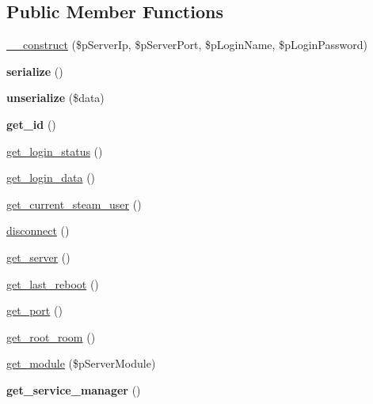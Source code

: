 \subsection*{Public Member Functions}
\begin{DoxyCompactItemize}
\item 
\hyperlink{classsteam__connector_a3076f259747852f77015c19d620247f2}{\_\-\_\-construct} (\$pServerIp, \$pServerPort, \$pLoginName, \$pLoginPassword)
\item 
\hypertarget{classsteam__connector_adbb7c9f66554f801fb9f9d9cffbcee2a}{
{\bfseries serialize} ()}
\label{classsteam__connector_adbb7c9f66554f801fb9f9d9cffbcee2a}

\item 
\hypertarget{classsteam__connector_a41443e8c5fc32e22a9622c1c799d1b94}{
{\bfseries unserialize} (\$data)}
\label{classsteam__connector_a41443e8c5fc32e22a9622c1c799d1b94}

\item 
\hypertarget{classsteam__connector_ade04f8f1607b1c9e231cfb18bcb102da}{
{\bfseries get\_\-id} ()}
\label{classsteam__connector_ade04f8f1607b1c9e231cfb18bcb102da}

\item 
\hyperlink{classsteam__connector_a19e7b6815de0c9b782027c7f951d1b1e}{get\_\-login\_\-status} ()
\item 
\hyperlink{classsteam__connector_aa168c3c05b37379418f79d4a9b5ce3b3}{get\_\-login\_\-data} ()
\item 
\hyperlink{classsteam__connector_a6dc38fa65af32f2038216f684e29dac6}{get\_\-current\_\-steam\_\-user} ()
\item 
\hyperlink{classsteam__connector_a606160ead141a3f6f137f3f7cd10b765}{disconnect} ()
\item 
\hyperlink{classsteam__connector_ae7ccee5b6dfd9129ffb37f334144d3ba}{get\_\-server} ()
\item 
\hyperlink{classsteam__connector_a428ddd853855d3eaf71e913a436c844a}{get\_\-last\_\-reboot} ()
\item 
\hyperlink{classsteam__connector_a0cd2eafa3645633c5d653d9a741b2e3a}{get\_\-port} ()
\item 
\hyperlink{classsteam__connector_a11582a8d9ca669f0ae2bb4c7ed862f63}{get\_\-root\_\-room} ()
\item 
\hyperlink{classsteam__connector_ac5f57d07a84611fe87f28d61ba44b33f}{get\_\-module} (\$pServerModule)
\item 
\hypertarget{classsteam__connector_a75dbcc6635fdbdc2503b703b0a60eea8}{
{\bfseries get\_\-service\_\-manager} ()}
\label{classsteam__connector_a75dbcc6635fdbdc2503b703b0a60eea8}


\end{DoxyCompactItemize}
